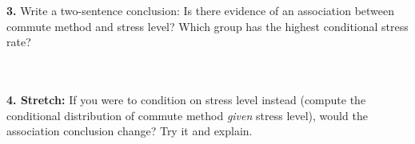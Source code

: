\documentclass[10pt]{article}
\begin{document}
\begin{tcolorbox}[colback=redbg, colframe=redacc, boxrule=0.9pt, arc=2mm,
    left=3mm, right=3mm, top=2mm, bottom=2mm,
    title={\bfseries Tier E --- Extension}, fonttitle=\bfseries\small, halign title=center]
\vspace{8pt}
\textbf{3.} Write a two-sentence conclusion: Is there evidence of an association between
commute method and stress level? Which group has the highest conditional stress rate?\\[6pt]
\writeline\\[1pt]\writeline\\[1pt]\writeline

\vspace{6pt}
\textbf{4. Stretch:} If you were to condition on stress level instead (compute the
conditional distribution of commute method \emph{given} stress level), would the
association conclusion change? Try it and explain.\\[6pt]
\writeline\\[1pt]\writeline

\end{tcolorbox}
\end{document}
